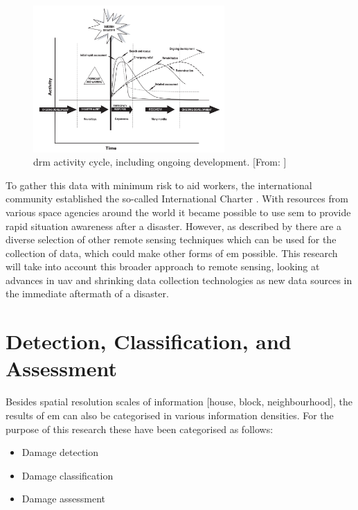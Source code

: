 \begin{figure}[!h]
	\centering
	\includegraphics[width=0.65\textwidth]{figs/Drm_activity.png}
	\caption{\footnotesize{\ac{drm} activity cycle, including ongoing development. [From: \citet[p. 19]{Wisner2002}]}}
	\label{fig:drm_cyc}
\end{figure}

 \noindent To gather this data with minimum risk to aid workers, the international community established the so-called International Charter \citep{Bessis2003}. With resources from various space agencies around the world it became possible to use \ac{sem} to provide rapid situation awareness after a disaster. However, as described by \citet{Kerle2008} there are a diverse selection of other remote sensing techniques which can be used for the collection of data, which could make other forms of \ac{em} possible. This research will take into account this broader approach to remote sensing, looking at advances in \ac{uav} and shrinking data collection technologies as new data sources in the immediate aftermath of a disaster.

\section{Detection, Classification, and Assessment} \label{sec:clas}

Besides spatial resolution scales of information [house, block, neighbourhood], the results of \ac{em} can also be categorised in various information densities. For the purpose of this research these have been categorised as follows:

\begin{itemize}
	\item Damage detection
	\item Damage classification
	\item Damage assessment
\end{itemize}

